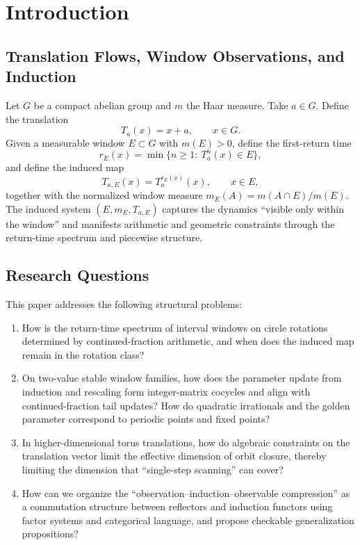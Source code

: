 \section{Introduction}

\subsection{Translation Flows, Window Observations, and Induction}

Let $G$ be a compact abelian group and $m$ the Haar measure. Take $a\in G$. Define the translation
\[
T_a(x)=x+a,\qquad x\in G.
\]
Given a measurable window $E\subset G$ with $m(E)>0$, define the first-return time
\[
r_E(x)=\min\{n\ge 1:\ T_a^n(x)\in E\},
\]
and define the induced map
\[
T_{a,E}(x)=T_a^{r_E(x)}(x),\qquad x\in E,
\]
together with the normalized window measure $m_E(A)=m(A\cap E)/m(E)$. The induced system $(E,m_E,T_{a,E})$ captures the dynamics ``visible only within the window'' and manifests arithmetic and geometric constraints through the return-time spectrum and piecewise structure.

\subsection{Research Questions}

This paper addresses the following structural problems:
\begin{enumerate}
  \item How is the return-time spectrum of interval windows on circle rotations determined by continued-fraction arithmetic, and when does the induced map remain in the rotation class?
  \item On two-value stable window families, how does the parameter update from induction and rescaling form integer-matrix cocycles and align with continued-fraction tail updates? How do quadratic irrationals and the golden parameter correspond to periodic points and fixed points?
  \item In higher-dimensional torus translations, how do algebraic constraints on the translation vector limit the effective dimension of orbit closure, thereby limiting the dimension that ``single-step scanning'' can cover?
  \item How can we organize the ``observation--induction--observable compression'' as a commutation structure between reflectors and induction functors using factor systems and categorical language, and propose checkable generalization propositions?
\end{enumerate}

